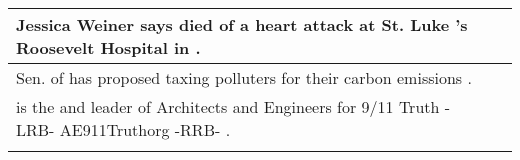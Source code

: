 \begin{longtable}{p{} P{1,3cm} }
\hline
{}  {Jessica Weiner says \underline{} died of a heart attack at St. Luke 's Roosevelt Hospital in \underline{} .} &    \\ 
\hline
{}  {Sen. \underline{} of \underline{} has proposed taxing polluters for their carbon emissions .} &    \\ 
\hline
{}  {\underline{} is the \underline{} and leader of Architects and Engineers for 9/11 Truth -LRB- AE911Truthorg -RRB- .} &    \\ 
\hline
\fi

\label{table02:tacred}
\end{longtable} 